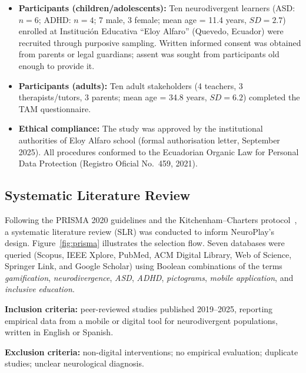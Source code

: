 \documentclass[preprint,12pt]{elsarticle}
\begin{document}
            \begin{itemize}
                \item \textbf{Participants (children/adolescents):} Ten neurodivergent learners (ASD: $n = 6$; ADHD: $n = 4$; 7 male, 3 female; mean age = 11.4 years, $SD = 2.7$) enrolled at Instituci\'on Educativa ``Eloy Alfaro'' (Quevedo, Ecuador) were recruited through purposive sampling. Written informed consent was obtained from parents or legal guardians; assent was sought from participants old enough to provide it.
                \item \textbf{Participants (adults):} Ten adult stakeholders (4 teachers, 3 therapists/tutors, 3 parents; mean age = 34.8 years, $SD = 6.2$) completed the TAM questionnaire.
                \item \textbf{Ethical compliance:} The study was approved by the institutional authorities of Eloy Alfaro school (formal authorisation letter, September 2025). All procedures conformed to the Ecuadorian Organic Law for Personal Data Protection (Registro Oficial No.~459, 2021).
            \end{itemize}
        
        \subsection{Systematic Literature Review}
        \label{subsec:slr}
            Following the PRISMA 2020 guidelines and the Kitchenham--Charters protocol~\cite{Kitchenham2007}, a systematic literature review (SLR) was conducted to inform NeuroPlay's design. Figure~\ref{fig:prisma} illustrates the selection flow. Seven databases were queried (Scopus, IEEE Xplore, PubMed, ACM Digital Library, Web of Science, Springer Link, and Google Scholar) using Boolean combinations of the terms \textit{gamification}, \textit{neurodivergence}, \textit{ASD}, \textit{ADHD}, \textit{pictograms}, \textit{mobile application}, and \textit{inclusive education}.
            
            \vspace{6pt}
            \noindent\textbf{Inclusion criteria:} peer-reviewed studies published 2019--2025, reporting empirical data from a mobile or digital tool for neurodivergent populations, written in English or Spanish.
            
            \vspace{6pt}
            \noindent\textbf{Exclusion criteria:} non-digital interventions; no empirical evaluation; duplicate studies; unclear neurological diagnosis.
\end{document}
